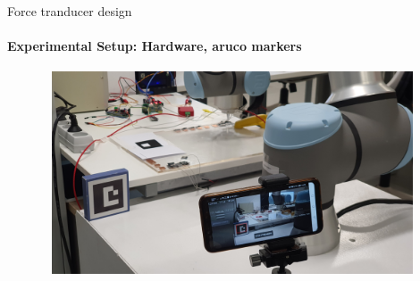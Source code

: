 \documentclass[aspectratio=169]{beamer}
\begin{document}
\begin{frame}[t]{Force tranducer design}
    \framesubtitle{Experimental Setup: Hardware, aruco markers}
    \vspace{-15pt}
    \begin{figure}[H]
        \centering\includegraphics[height=6cm,width=1\textwidth,keepaspectratio]{exp_stand2}
        \label{fig:exp_stand2}
    \end{figure}
\end{frame}
\end{document}
